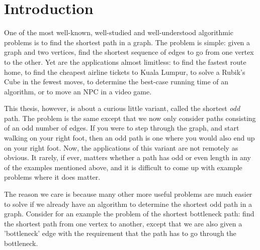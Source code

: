 \chapter{Introduction}

One of the most well-known, well-studied and well-understood algorithmic problems is to find the shortest path in a graph. The problem is simple: given a graph and two vertices, find the shortest sequence of edges to go from one vertex to the other. Yet are the applications almost limitless: to find the fastest route home, to find the cheapest airline tickets to Kuala Lumpur, to solve a Rubik's Cube in the fewest moves, to determine the best-case running time of an algorithm, or to move an NPC in a video game.

This thesis, however, is about a curious little variant, called the shortest \emph{odd} path. The problem is the same except that we now only consider paths consisting of an odd number of edges. If you were to step through the graph, and start walking on your right foot, then an odd path is one where you would also end up on your right foot. Now, the applications of this variant are not remotely as obvious. It rarely, if ever, matters whether a path has odd or even length in any of the examples mentioned above, and it is difficult to come up with example problems where it does matter.

The reason we care is because many other more useful problems are much easier to solve if we already have an algorithm to determine the shortest odd path in a graph. Consider for an example the problem of the shortest bottleneck path: find the shortest path from one vertex to another, except that we are also given a 'bottleneck' edge with the requirement that the path has to go through the bottleneck. 

